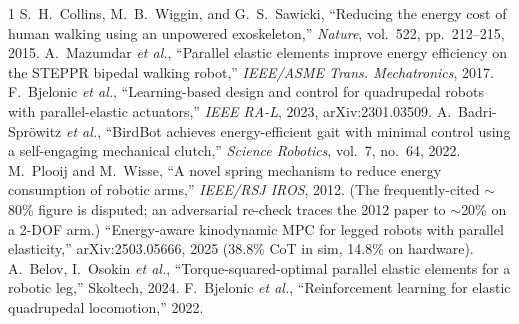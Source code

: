 \documentclass[journal]{IEEEtran}
\begin{document}
\begin{thebibliography}{1}
 S.~H.~Collins, M.~B.~Wiggin, and G.~S.~Sawicki, ``Reducing the energy cost of human walking
using an unpowered exoskeleton,'' \emph{Nature}, vol.~522, pp.~212--215, 2015.
 A.~Mazumdar \emph{et al.}, ``Parallel elastic elements improve energy efficiency on the
STEPPR bipedal walking robot,'' \emph{IEEE/ASME Trans. Mechatronics}, 2017.
 F.~Bjelonic \emph{et al.}, ``Learning-based design and control for quadrupedal robots with
parallel-elastic actuators,'' \emph{IEEE RA-L}, 2023, arXiv:2301.03509.
 A.~Badri-Spr\"owitz \emph{et al.}, ``BirdBot achieves energy-efficient gait with minimal
control using a self-engaging mechanical clutch,'' \emph{Science Robotics}, vol.~7, no.~64, 2022.
 M.~Plooij and M.~Wisse, ``A novel spring mechanism to reduce energy consumption of robotic
arms,'' \emph{IEEE/RSJ IROS}, 2012. (The frequently-cited $\sim$80\% figure is disputed; an adversarial re-check
traces the 2012 paper to $\sim$20\% on a 2-DOF arm.)
 ``Energy-aware kinodynamic MPC for legged robots with parallel elasticity,''
arXiv:2503.05666, 2025 (38.8\% CoT in sim, 14.8\% on hardware).
 A.~Belov, I.~Osokin \emph{et al.}, ``Torque-squared-optimal parallel elastic elements for a
robotic leg,'' Skoltech, 2024.
 F.~Bjelonic \emph{et al.}, ``Reinforcement learning for elastic quadrupedal locomotion,''
2022.
\end{thebibliography}
\end{document}
